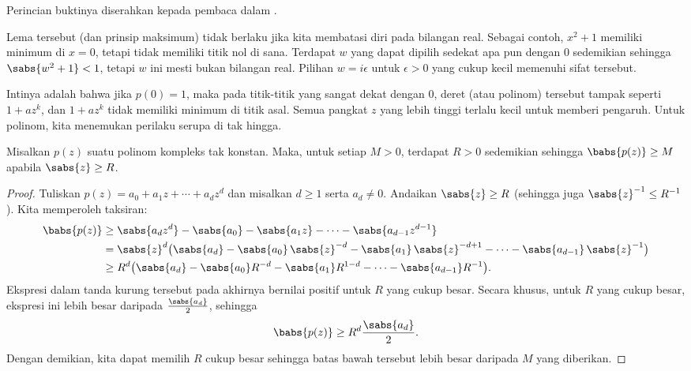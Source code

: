 Perincian buktinya diserahkan kepada pembaca dalam
.

\begin{remark}
Lema tersebut (dan prinsip maksimum) tidak berlaku jika kita membatasi diri pada bilangan real.  Sebagai
contoh, $x^2+1$ memiliki minimum di $x=0$, tetapi tidak memiliki titik nol di sana.
Terdapat $w$ yang dapat dipilih sedekat apa pun dengan $0$ sedemikian sehingga $\sabs{w^2+1} < 1$, tetapi
$w$ ini mesti bukan bilangan real.  Pilihan $w = i\epsilon$ untuk
$\epsilon > 0$ yang cukup kecil memenuhi sifat tersebut.
\end{remark}

Intinya adalah bahwa jika $p(0) = 1$, maka pada titik-titik yang sangat dekat dengan 0,
deret (atau polinom) tersebut
tampak seperti $1+az^k$, dan $1+az^k$ tidak memiliki minimum di titik asal.  Semua
pangkat $z$ yang lebih tinggi terlalu kecil untuk memberi pengaruh.  Untuk polinom, kita menemukan perilaku serupa
di tak hingga.

\begin{lemma}
Misalkan $p(z)$ suatu polinom kompleks tak konstan.  Maka, untuk setiap $M > 0$, terdapat
$R > 0$ sedemikian sehingga
$\babs{p(z)} \geq M$ apabila $\sabs{z} \geq R$.
\end{lemma}

\begin{proof}
Tuliskan $p(z) = a_0 + a_1 z + \cdots + a_d z^d$ dan misalkan $d \geq 1$
serta $a_d \neq 0$.
Andaikan $\sabs{z} \geq R$ (sehingga juga $\sabs{z}^{-1} \leq R^{-1}$).
Kita memperoleh taksiran:
\begin{equation*}
\begin{split}
\babs{p(z)}
& \geq
\sabs{a_d z^d} -
\sabs{a_0} - \sabs{a_1 z} - \cdots - \sabs{a_{d-1} z^{d-1} }
\\
& =
\sabs{z}^d \bigl(
\sabs{a_d} -
\sabs{a_0} \, \sabs{z}^{-d} -
\sabs{a_1} \, \sabs{z}^{-d+1} - \cdots - \sabs{a_{d-1}} \, \sabs{z}^{-1}
\bigr)
\\
& \geq
R^d \bigl(\sabs{a_d} -
\sabs{a_0}R^{-d} - \sabs{a_1}R^{1-d} - \cdots - \sabs{a_{d-1}}R^{-1} \bigr)
.
\end{split}
\end{equation*}
Ekspresi dalam tanda kurung tersebut pada akhirnya bernilai positif untuk
$R$ yang cukup besar.  Secara khusus, untuk $R$ yang cukup besar, ekspresi ini
lebih besar daripada
$\frac{\sabs{a_d}}{2}$, sehingga
\begin{equation*}
\babs{p(z)}
\geq
R^d \frac{\sabs{a_d}}{2} .
\end{equation*}
Dengan demikian,
kita dapat memilih $R$ cukup besar sehingga batas bawah tersebut lebih besar daripada $M$ yang diberikan.
\end{proof}

